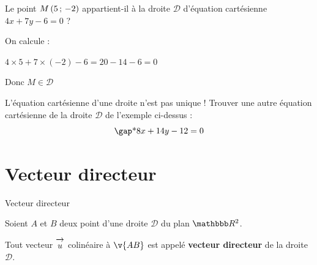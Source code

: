 \documentclass[10pt,a4paper,openany,twoside, prof]{book}
\begin{document}
\begin{ex}{}{}
   Le point $M\left(5\,;\,-2\right)$ appartient-il à la droite $\mathcal{D}$ d'équation cartésienne $4x+7y-6=0$ \;?

   \begin{reponse}
      On calcule :

         $4\times 5 + 7 \times (-2) - 6 = 20-14-6=0$

      Donc $M\in\mathcal{D}$
   \end{reponse}
\end{ex}

\begin{rem}{}{}
   L'équation cartésienne d'une droite n'est pas unique ! Trouver une autre équation cartésienne de la droite $\mathcal{D}$ de l'exemple ci-dessus :
   $$\troum{8x+14y-12=0}$$
   \medskip
\end{rem}


\vspace{-5mm}
\section{Vecteur directeur}

\begin{defi}{Vecteur directeur}{}
   \begin{minipage}{.5\textwidth}

      Soient $A$ et $B$ deux point d'une droite $\mathcal{D}$ du plan $\R^2$.

   \noindent Tout vecteur $\overrightarrow{\,\mathstrut u\,}$ colinéaire à $\v{AB}$ est appelé \textbf{vecteur directeur} de la droite $\mathcal{D}$.
\end{minipage}
\begin{minipage}{.5\textwidth}
\end{minipage}
\end{defi}
\end{document}
